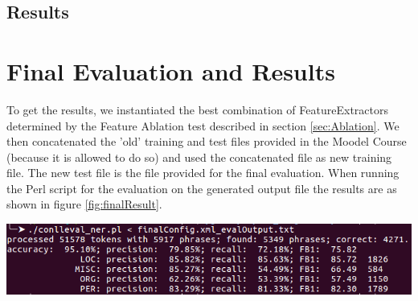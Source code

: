 \documentclass[11pt, english]{article}
\begin{document}
\subsection{Results}
\label{sec:AblationResult}

\section{Final Evaluation and Results}
To get the results, we instantiated the best combination of FeatureExtractors determined by the Feature Ablation test described in section \ref{sec:Ablation}. We then concatenated the 'old' training and test files provided in the Moodel Course (because it is allowed to do so) and used the concatenated file as new training file. The new test file is the file provided for the final evaluation. When running the Perl script for the evaluation on the generated output file the results are as shown in figure \ref{fig:finalResult}.


\includegraphics[width=\linewidth, keepaspectratio]{gfx/finalEvalOut.png}
\label{fig:finalResult}
\end{document}
